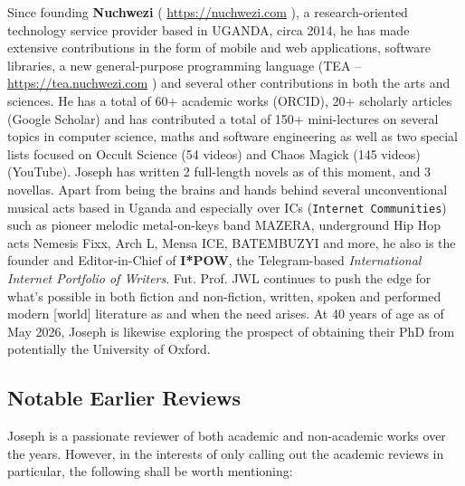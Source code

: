 \documentclass[a4paper]{article}
\begin{document}
Since founding \textbf{Nuchwezi} ( \url{https://nuchwezi.com} ), a research-oriented technology service provider based in UGANDA, circa 2014, he has made extensive contributions in the form of mobile and web applications, software libraries, a new general-purpose programming language (TEA – \url{https://tea.nuchwezi.com} ) and several other contributions in both the arts and sciences. He has a total of 60+ academic works (ORCID), 20+ scholarly articles (Google Scholar) and has contributed a total of 150+ mini-lectures on several topics in computer science, maths and software engineering as well as two special lists focused on Occult Science (54 videos) and Chaos Magick (145 videos) (YouTube). Joseph has written 2 full-length novels as of this moment, and 3 novellas. Apart from being the brains and hands behind several unconventional musical acts based in Uganda and especially over ICs (\texttt{Internet Communities}) such as pioneer melodic metal-on-keys band MAZERA, underground Hip Hop acts Nemesis Fixx, Arch L, Mensa ICE, BATEMBUZYI and more, he also is the founder and Editor-in-Chief of \textbf{I*POW}, the Telegram-based \textit{International Internet Portfolio of Writers}. Fut. Prof. JWL continues to push the edge for what's possible in both fiction and non-fiction, written, spoken and performed modern [world] literature as and when the need arises. At 40 years of age as of May 2026, Joseph is likewise exploring the prospect of obtaining their PhD from potentially the University of Oxford.

\subsection{Notable Earlier Reviews}
\label{SECREVIEWS}

Joseph is a passionate reviewer of both academic and non-academic works over the years. However, in the interests of only calling out the academic reviews in particular, the following shall be worth mentioning:
\end{document}
